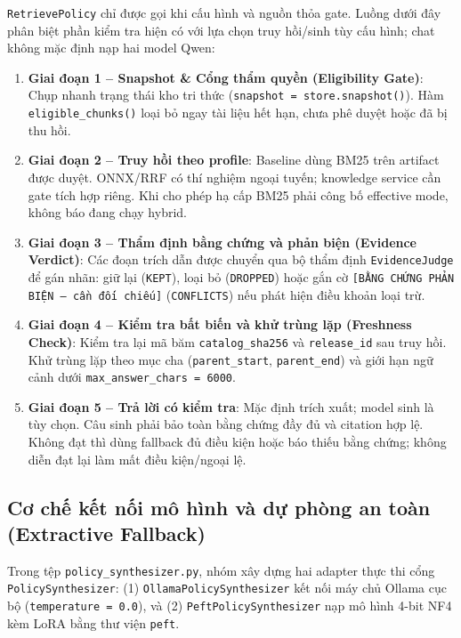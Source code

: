 \texttt{RetrievePolicy} chỉ được gọi khi cấu hình và nguồn thỏa gate. Luồng dưới đây phân biệt phần kiểm tra hiện có với lựa chọn truy hồi/sinh tùy cấu hình; chat không mặc định nạp hai model Qwen:
\begin{enumerate}[nosep]
  \item \textbf{Giai đoạn 1 -- Snapshot \& Cổng thẩm quyền (Eligibility Gate)}: Chụp nhanh trạng thái kho tri thức (\texttt{snapshot = store.snapshot()}). Hàm \texttt{eligible\_chunks()} loại bỏ ngay tài liệu hết hạn, chưa phê duyệt hoặc đã bị thu hồi.
  \item \textbf{Giai đoạn 2 -- Truy hồi theo profile}: Baseline dùng BM25 trên artifact được duyệt. ONNX/RRF có thí nghiệm ngoại tuyến; knowledge service cần gate tích hợp riêng. Khi cho phép hạ cấp BM25 phải công bố effective mode, không báo đang chạy hybrid.
  \item \textbf{Giai đoạn 3 -- Thẩm định bằng chứng và phản biện (Evidence Verdict)}: Các đoạn trích dẫn được chuyển qua bộ thẩm định \texttt{EvidenceJudge} để gán nhãn: giữ lại (\texttt{KEPT}), loại bỏ (\texttt{DROPPED}) hoặc gắn cờ \texttt{[BẰNG CHỨNG PHẢN BIỆN — cần đối chiếu]} (\texttt{CONFLICTS}) nếu phát hiện điều khoản loại trừ.
  \item \textbf{Giai đoạn 4 -- Kiểm tra bất biến và khử trùng lặp (Freshness Check)}: Kiểm tra lại mã băm \texttt{catalog\_sha256} và \texttt{release\_id} sau truy hồi. Khử trùng lặp theo mục cha (\texttt{parent\_start}, \texttt{parent\_end}) và giới hạn ngữ cảnh dưới \texttt{max\_answer\_chars = 6000}.
  \item \textbf{Giai đoạn 5 -- Trả lời có kiểm tra}: Mặc định trích xuất; model sinh là tùy chọn. Câu sinh phải bảo toàn bằng chứng đầy đủ và citation hợp lệ. Không đạt thì dùng fallback đủ điều kiện hoặc báo thiếu bằng chứng; không diễn đạt lại làm mất điều kiện/ngoại lệ.
\end{enumerate}

\subsection{Cơ chế kết nối mô hình và dự phòng an toàn (Extractive Fallback)}

Trong tệp \nolinkurl{policy_synthesizer.py}, nhóm xây dựng hai adapter thực thi cổng \texttt{PolicySynthesizer}: (1) \texttt{OllamaPolicySynthesizer} kết nối máy chủ Ollama cục bộ (\texttt{temperature = 0.0}), và (2) \texttt{PeftPolicySynthesizer} nạp mô hình 4-bit NF4 kèm LoRA bằng thư viện \texttt{peft}.

